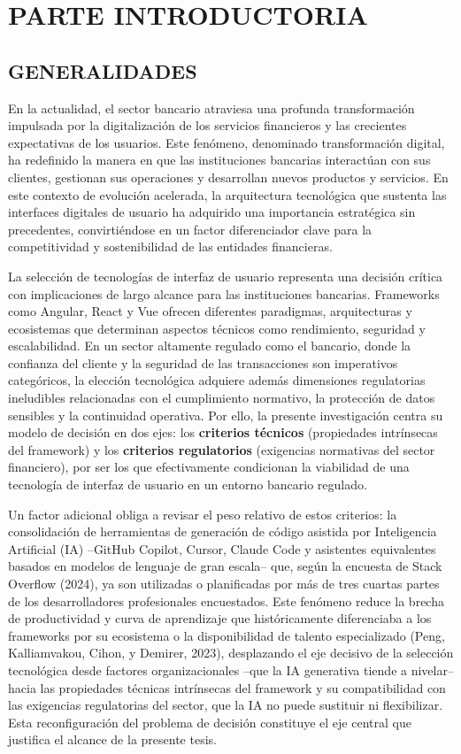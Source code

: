 \chapter{PARTE INTRODUCTORIA}

\section{GENERALIDADES}


En la actualidad, el sector bancario atraviesa una profunda transformación
impulsada por la digitalización de los servicios financieros y las crecientes
expectativas de los usuarios. Este fenómeno, denominado transformación
digital, ha redefinido la manera en que las instituciones bancarias interactúan
con sus clientes, gestionan sus operaciones y desarrollan nuevos productos y
servicios. En este contexto de evolución acelerada, la arquitectura tecnológica
que sustenta las interfaces digitales de usuario ha adquirido una importancia
estratégica sin precedentes, convirtiéndose en un factor diferenciador clave
para la competitividad y sostenibilidad de las entidades financieras.

La selección de tecnologías de interfaz de usuario representa una decisión
crítica con implicaciones de largo alcance para las instituciones bancarias.
Frameworks como Angular, React y Vue ofrecen diferentes paradigmas,
arquitecturas y ecosistemas que determinan aspectos técnicos como
rendimiento, seguridad y escalabilidad. En un sector altamente regulado como
el bancario, donde la confianza del cliente y la seguridad de las transacciones
son imperativos categóricos, la elección tecnológica adquiere además
dimensiones regulatorias ineludibles relacionadas con el cumplimiento
normativo, la protección de datos sensibles y la continuidad operativa. Por
ello, la presente investigación centra su modelo de decisión en dos ejes:
los \textbf{criterios técnicos} (propiedades intrínsecas del framework) y los
\textbf{criterios regulatorios} (exigencias normativas del sector financiero),
por ser los que efectivamente condicionan la viabilidad de una tecnología de
interfaz de usuario en un entorno bancario regulado.

Un factor adicional obliga a revisar el peso relativo de estos criterios: la
consolidación de herramientas de generación de código asistida por
Inteligencia Artificial (IA) --GitHub Copilot, Cursor, Claude Code y asistentes
equivalentes basados en modelos de lenguaje de gran escala-- que, según la
encuesta de Stack Overflow (2024), ya son utilizadas o planificadas por más
de tres cuartas partes de los desarrolladores profesionales encuestados. Este
fenómeno reduce la brecha de productividad y curva de aprendizaje que
históricamente diferenciaba a los frameworks por su ecosistema o la
disponibilidad de talento especializado (Peng, Kalliamvakou, Cihon, y
Demirer, 2023), desplazando el eje decisivo de la selección tecnológica desde
factores organizacionales --que la IA generativa tiende a nivelar-- hacia las
propiedades técnicas intrínsecas del framework y su compatibilidad con las
exigencias regulatorias del sector, que la IA no puede sustituir ni flexibilizar.
Esta reconfiguración del problema de decisión constituye el eje central que
justifica el alcance de la presente tesis.


